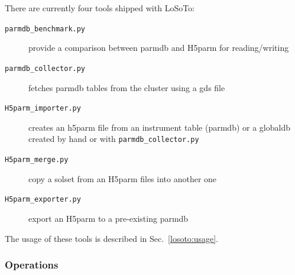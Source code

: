 \documentclass[]{article}
\def \losoto {LoSoTo}
\begin{document}
There are currently four tools shipped with \losoto{}:
\begin{description}
 \item[\texttt{parmdb\_benchmark.py}] provide a comparison between parmdb and H5parm for reading/writing
 \item[\texttt{parmdb\_collector.py}] fetches parmdb tables from the cluster using a gds file
 \item[\texttt{H5parm\_importer.py}] creates an h5parm file from an instrument table (parmdb) or a globaldb created by hand or with \texttt{parmdb\_collector.py}
 \item[\texttt{H5parm\_merge.py}] copy a solset from an H5parm files into another one
 \item[\texttt{H5parm\_exporter.py}] export an H5parm to a pre-existing parmdb
\end{description}

The usage of these tools is described in Sec.~\ref{losoto:usage}.

\subsubsection{Operations}
\label{losoto:operations}
\end{document}
